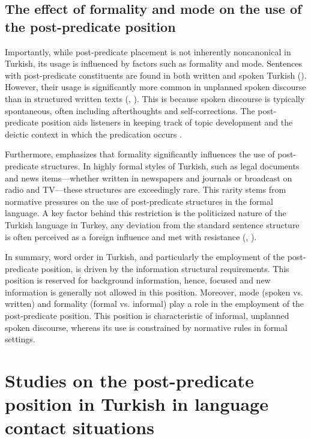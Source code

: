 \subsection{The effect of formality and mode on the use of the post-predicate position} \label{sec:key:3.1.1}

Importantly, while post-predicate placement is not inherently noncanonical in Turkish, its usage is influenced by factors such as formality and mode. Sentences with post-predicate constituents are found in both written and spoken Turkish (\citealt{Antonova-unlu2015}). However, their usage is significantly more common in unplanned spoken discourse than in structured written texts (\citealt{Schroeder1995, Schroeder2002}, \citealt{Erdal1999}). This is because spoken discourse is typically spontaneous, often including afterthoughts and self-corrections. The post-predicate position aids listeners in keeping track of topic development and the deictic context in which the predication occurs \citep{Schroeder1995}.

Furthermore, \citet{Erguvanli1984} emphasizes that formality significantly influences the use of post-predicate structures. In highly formal styles of Turkish, such as legal documents and news items—whether written in newspapers and journals or broadcast on radio and TV—these structures are exceedingly rare. This rarity stems from normative pressures on the use of post-predicate structures in the formal language. A key factor behind this restriction is the politicized nature of the Turkish language in Turkey, any deviation from the standard sentence structure is often perceived as a foreign influence and met with resistance (\citealt{Erdal1999}, \citealt{KucukEtAl2017}).

In summary, word order in Turkish, and particularly the employment of the post-predicate position, is driven by the information structural requirements. This position is reserved for background information, hence, focused and new information is generally not allowed in this position. Moreover, mode (spoken vs. written) and formality (formal vs. informal) play a role in the employment of the post-predicate position. This position is characteristic of informal, unplanned spoken discourse, whereas its use is constrained by normative rules in formal settings.

\section[Post-predicate position in {Turkish} in language contact situations]{Studies on the post-predicate position in {Turkish} in language contact situations}\label{sec:key:3.2}

